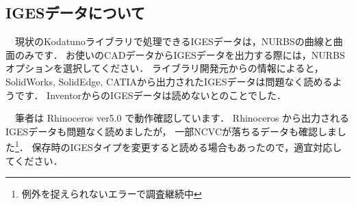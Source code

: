 \subsection{IGESデータについて}
　現状のKodatunoライブラリで処理できるIGESデータは，NURBSの曲線と曲面のみです．
お使いのCADデータからIGESデータを出力する際には，NURBSオプションを選択してください．
ライブラリ開発元からの情報によると，SolidWorks, SolidEdge, CATIAから出力されたIGESデータは問題なく読めるようです．
InventorからのIGESデータは読めないとのことでした．

　筆者は Rhinoceros ver5.0 で動作確認しています．
Rhinoceros から出力されるIGESデータも問題なく読めましたが，
一部NCVCが落ちるデータも確認しました\footnote{例外を捉えられないエラーで調査継続中}．
保存時のIGESタイプを変更すると読める場合もあったので，適宜対応してください．
